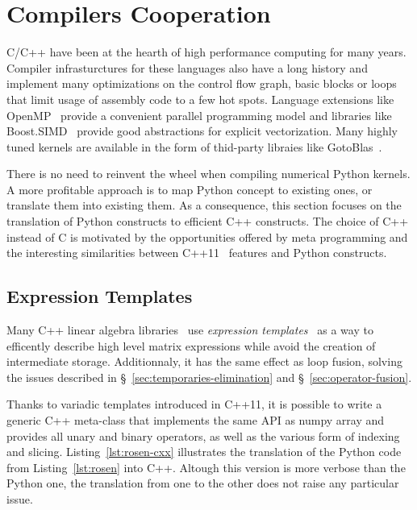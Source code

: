 \documentclass[10pt, preprint]{sigplanconf}
\begin{document}
\section{Compilers Cooperation}
\label{sec:pythran}

C/C++ have been at the hearth of high performance computing for many years.
Compiler infrasturctures for these languages also have a long history and
implement many optimizations on the control flow graph, basic blocks or
loops~\cite{Aho2006} that limit usage of assembly code to a few hot spots.
Language extensions like OpenMP~\cite{openmp4} provide a convenient parallel
programming model and libraries like Boost.SIMD~\cite{esterie2012boost} provide 
good abstractions for explicit vectorization. Many highly tuned kernels are
available in the form of thid-party libraies like GotoBlas~\cite{gotoblas2008}.

There is no need to reinvent the wheel when compiling numerical Python kernels.
A more profitable approach is to map Python concept to existing ones, or
translate them into existing them. As a consequence, this section focuses on
the translation of Python constructs to efficient C++ constructs. The choice of
C++ instead of C is motivated by the opportunities offered by meta programming
and the interesting similarities between C++11~\cite{isocxx11} features and
Python constructs.

\subsection{Expression Templates}
\label{sec:expression-templates}

Many C++ linear algebra libraries~\cite{eigen,ublas} use \emph{expression
templates}~\cite{expression_templates, et2012} as a way to efficently describe high
level matrix expressions while avoid the creation of intermediate storage.
Additionnaly, it has the same effect as loop fusion, solving the issues
described in \S~\ref{sec:temporaries-elimination} and
\S~\ref{sec:operator-fusion}.

Thanks to variadic templates introduced in C++11, it is possible to write a
generic C++ meta-class that implements the same API as numpy array and provides
all unary and binary operators, as well as the various form of indexing and
slicing. Listing~\ref{lst:rosen-cxx} illustrates the translation of the Python
code from Listing~\ref{lst:rosen} into C++. Altough this version is more
verbose than the Python one, the translation from one to the other does not
raise any particular issue.
\end{document}
